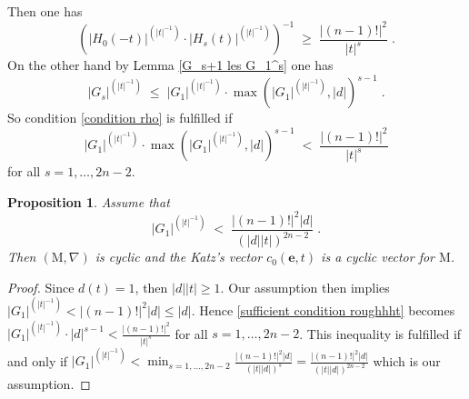 \documentclass{compositio}
\newtheorem{proposition}[theorem]{Proposition}
\numberwithin{equation}{section}
\begin{document}
Then one has 
\begin{equation}
(|H_0(-t)|^{(|t|^{-1})}\cdot|H_s(t)|^{(|t|^{-1})})^{-1}
\;\geq\; \frac{|(n-1)!|^2}{|t|^s}\;.
\end{equation}
On the other hand by Lemma \ref{G_s+1 les G_1^s} one has
\begin{equation}
|G_s|^{(|t|^{-1})}\;\leq\;|G_1|^{(|t|^{-1})}\cdot\max(|G_1|^{(|t|^{-1})},|d|)^{s-1}\;.
\end{equation}
So condition \eqref{condition rho} is fulfilled if
\begin{equation}\label{sufficient condition roughhht}
|G_1|^{(|t|^{-1})}\cdot\max(|G_1|^{(|t|^{-1})},|d|)^{s-1} \; < \;\frac{|(n-1)!|^2}{|t|^s}
\end{equation}
for all $s=1,\ldots,2n-2$. 
\begin{proposition}
Assume that
\begin{equation}
|G_1|^{(|t|^{-1})}\;<\;\frac{|(n-1)!|^2|d|}{(|d||t|)^{2n-2}}\;.
\end{equation}
Then $({\mathrm{M}},\nabla)$ is cyclic and the Katz's vector $c_0({\mathbf{e}},t)$ is a cyclic vector for ${\mathrm{M}}$.
\end{proposition}
\begin{proof}
Since $d(t)=1$, then $|d||t|\geq 1$. Our assumption then implies $|G_1|^{(|t|^{-1})}<|(n-1)!|^2|d|\leq|d|$. Hence 
\eqref{sufficient condition roughhht} becomes $|G_1|^{(|t|^{-1})}\cdot|d|^{s-1}<\frac{|(n-1)!|^2}{|t|^s}$ for all 
$s=1,\ldots,2n-2$. This inequality is fulfilled if and only if 
$|G_1|^{(|t|^{-1})}<\min_{s=1,\ldots,2n-2}\frac{|(n-1)!|^2|d|}{(|t||d|)^s}= 
\frac{|(n-1)!|^2|d|}{(|t||d|)^{2n-2}}$ which 
is our assumption.
\end{proof}
\end{document}
